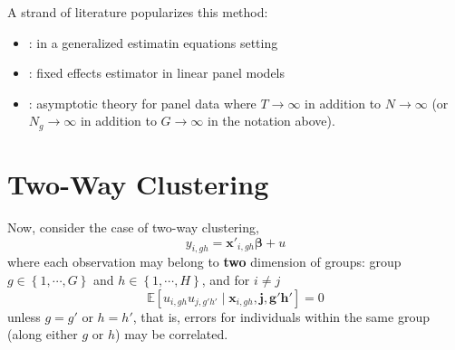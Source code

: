 \documentclass[twoside]{article}
\begin{document}
A strand of literature popularizes 
this method:
\begin{itemize}
    \item \citet{liang1986longitudinal}: in a generalized estimatin equations setting
    \item \citet{arellano1987computing}: fixed effects estimator in linear panel models
    \item \citet{hansen2007asymptotic}: asymptotic theory for panel data where $T\rightarrow\infty$ in addition to $N\rightarrow\infty$ (or $N_g\rightarrow\infty$ in addition to $G\rightarrow\infty$ in the notation above).
\end{itemize}

\section{Two-Way Clustering}\label{sec:twoway_cluster}
Now, consider the case of two-way clustering, 
$$
y_{i,gh} = \mathbf{x}'_{i,gh}\boldsymbol{\beta} + u
$$
where each observation may belong to \textbf{two} dimension of groups: group $g\in \left\{1,\cdots,G\right\}$ and $h\in \left\{ 1,\cdots,H \right\}$, and for $i\neq j$
\begin{equation}\label{eq:twoway_errors}
    \mathbb{E} \left[ u_{i,gh} u_{j,g'h'} \mid \mathbf{x}_{i,gh},\mathbf{j,g'h'} \right] = 0
\end{equation}
unless $g=g'$ or $h=h'$, that is, errors for individuals within the same group (along either $g$ or $h$) may be correlated.
\end{document}
